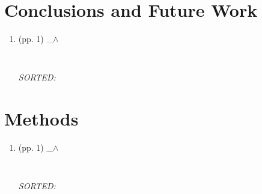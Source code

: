 \documentclass[12pt]{article}
\begin{document}
\section{Conclusions and Future Work}


\begin{enumerate}

\item  (pp. 1)  \_$\wedge$  

	\begin{verbatim}
	
	\end{verbatim}
	\textit{
	SORTED:  
	}
	\\


\end{enumerate}




\section{Methods}


\begin{enumerate}

\item  (pp. 1)  \_$\wedge$  

	\begin{verbatim}
	
	\end{verbatim}
	\textit{
	SORTED:  
	}
	\\


\end{enumerate}
\end{document}
